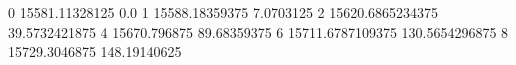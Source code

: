 0 15581.11328125 0.0
1 15588.18359375 7.0703125
2 15620.6865234375 39.5732421875
4 15670.796875 89.68359375
6 15711.6787109375 130.5654296875
8 15729.3046875 148.19140625
